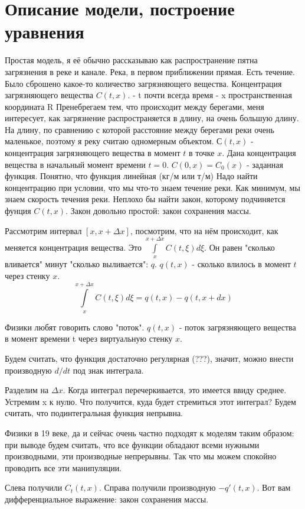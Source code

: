 \section{Описание модели, построение уравнения}
Простая модель, я её обычно рассказываю как распространение пятна загрязнения в реке и канале. Река, в первом приближении прямая. Есть течение. Было сброшено какое-то количество загрязняющего вещества. Концентрация загрязняющего вещества  $C(t,x)$.
- t почти всегда время
- x пространственная координата R
Пренебрегаем тем, что происходит между берегами, меня интересует, как загрязнение распространяется в длину, на очень большую длину. На длину, по сравнению с которой расстояние между берегами реки очень маленькое, поэтому я реку считаю одномерным объектом.
$С(t, x)$ - концентрация загрязняющего вещества в момент $t$ в точке $x$.
Дана концентрация вещества в начальный момент времени $t = 0$.
$C(0, x) = C_0(x)$ - заданная функция.
Понятно, что функция линейная (кг/м или т/м)
Надо найти концентрацию при условии, что мы что-то знаем течение реки. Как минимум, мы знаем скорость течения реки. Неплохо бы найти закон, которому подчиняется фунция $C(t,x)$. Закон довольно простой: закон сохранения массы.

Рассмотрим интервал $[x, x + \Delta x]$, посмотрим, что на нём происходит, как меняется концентрация вещества. Это $\displaystyle \int \limits_x^{x + \Delta x} C(t, \xi) d \xi$. Он равен "сколько вливается" минут "сколько выливается": $q$. $q(t, x)$ - сколько влилось в момент $t$ через стенку $x$.
$$\displaystyle \int \limits_x^{x + \Delta x} \! C(t, \xi) d \xi = q(t, x) - q(t, x + dx)$$

Физики любят говорить слово "поток". $q(t,x)$ - поток загрязняющего вещества в момент времени t через виртуальную стенку $x$.


Будем считать, что функция достаточно регулярная (???), значит, можно внести производную $d/dt$ под знак интеграла.


Разделим на $\Delta x$. Когда интеграл перечеркивается, это имеется ввиду среднее.
Устремим x к нулю. Что получится, куда будет стремиться этот интеграл? Будем считать, что подинтегральная функция непрывна.

Физики в 19 веке, да и сейчас очень частно подходят к моделям таким образом: при выводе будем считать, что все функции обладают всеми нужными производными, эти производные непрерывны. Так что мы можем спокойно проводить все эти манипуляции.

Слева получили $C_t(t,x)$. Справа получили производную $-q'(t,x)$.
Вот вам дифференциальное выражение: закон сохранения массы.


